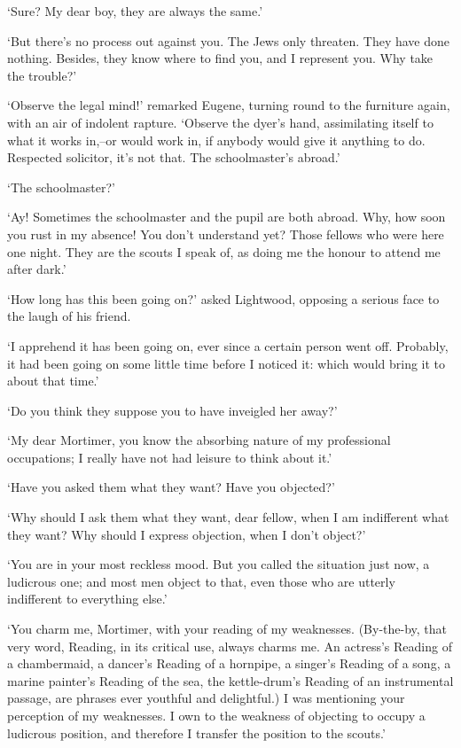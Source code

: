 ‘Sure? My dear boy, they are always the same.’

‘But there’s no process out against you. The Jews only threaten. They
have done nothing. Besides, they know where to find you, and I represent
you. Why take the trouble?’

‘Observe the legal mind!’ remarked Eugene, turning round to the
furniture again, with an air of indolent rapture. ‘Observe the dyer’s
hand, assimilating itself to what it works in,--or would work in, if
anybody would give it anything to do. Respected solicitor, it’s not
that. The schoolmaster’s abroad.’

‘The schoolmaster?’

‘Ay! Sometimes the schoolmaster and the pupil are both abroad. Why, how
soon you rust in my absence! You don’t understand yet? Those fellows
who were here one night. They are the scouts I speak of, as doing me the
honour to attend me after dark.’

‘How long has this been going on?’ asked Lightwood, opposing a serious
face to the laugh of his friend.

‘I apprehend it has been going on, ever since a certain person went off.
Probably, it had been going on some little time before I noticed it:
which would bring it to about that time.’

‘Do you think they suppose you to have inveigled her away?’

‘My dear Mortimer, you know the absorbing nature of my professional
occupations; I really have not had leisure to think about it.’

‘Have you asked them what they want? Have you objected?’

‘Why should I ask them what they want, dear fellow, when I am
indifferent what they want? Why should I express objection, when I don’t
object?’

‘You are in your most reckless mood. But you called the situation just
now, a ludicrous one; and most men object to that, even those who are
utterly indifferent to everything else.’

‘You charm me, Mortimer, with your reading of my weaknesses. (By-the-by,
that very word, Reading, in its critical use, always charms me. An
actress’s Reading of a chambermaid, a dancer’s Reading of a hornpipe, a
singer’s Reading of a song, a marine painter’s Reading of the sea,
the kettle-drum’s Reading of an instrumental passage, are phrases
ever youthful and delightful.) I was mentioning your perception of my
weaknesses. I own to the weakness of objecting to occupy a ludicrous
position, and therefore I transfer the position to the scouts.’

